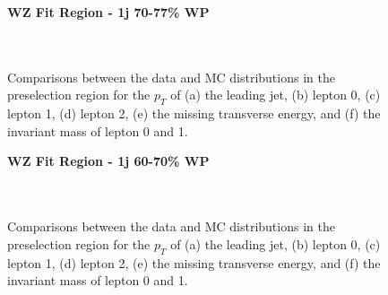 \begin{figure}[H]
    \centering
    \textbf{WZ Fit Region - 1j 70-77\% WP}\\
    \\
    \\
    \caption{Comparisons between the data and MC distributions in the preselection region for the $p_T$ of (a) the leading jet, (b) lepton 0, (c) lepton 1, (d) lepton 2, (e) the missing transverse energy, and (f) the invariant mass of lepton 0 and 1.}
    \label{kin:WP_1j_70_77}   
\end{figure}

\begin{figure}[H]
    \centering
    \textbf{WZ Fit Region - 1j 60-70\% WP}\\
    \\
    \\
    \caption{Comparisons between the data and MC distributions in the preselection region for the $p_T$ of (a) the leading jet, (b) lepton 0, (c) lepton 1, (d) lepton 2, (e) the missing transverse energy, and (f) the invariant mass of lepton 0 and 1.}
    \label{kin:WP_1j_60_70}
\end{figure}

